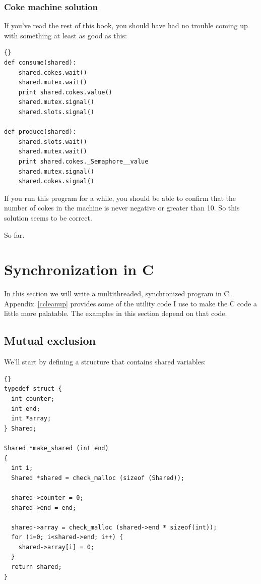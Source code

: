 \documentclass{book}
\newcommand{\clearemptydoublepage}{\newpage\cleardoublepage}
\begin{document}
\clearemptydoublepage
\subsection {Coke machine solution}

If you've read the rest of this book, you should have had no
trouble coming up with something at least as good as this:

\begin{lstlisting}[caption={}]{}
def consume(shared):
    shared.cokes.wait()
    shared.mutex.wait()
    print shared.cokes.value()
    shared.mutex.signal()
    shared.slots.signal()

def produce(shared):
    shared.slots.wait()
    shared.mutex.wait()
    print shared.cokes._Semaphore__value
    shared.mutex.signal()
    shared.cokes.signal()
\end{lstlisting}

If you run this program for a while, you should be able to confirm
that the number of cokes in the machine is never negative or greater
than 10.  So this solution seems to be correct.

So far.


\chapter{Synchronization in C}
\label{csync}

In this section we will write a multithreaded, synchronized
program in C.  Appendix~\ref{ccleanup} provides some of the utility
code I use to make the C code a little more palatable.  The
examples in this section depend on that code.

\section{Mutual exclusion}

We'll start by defining a structure that contains shared
variables:

\begin{lstlisting}[caption={}]{}
typedef struct {
  int counter;
  int end;
  int *array;
} Shared;

Shared *make_shared (int end)
{
  int i;
  Shared *shared = check_malloc (sizeof (Shared));

  shared->counter = 0;
  shared->end = end;

  shared->array = check_malloc (shared->end * sizeof(int));
  for (i=0; i<shared->end; i++) {
    shared->array[i] = 0;
  }
  return shared;
}
\end{lstlisting}
\end{document}
